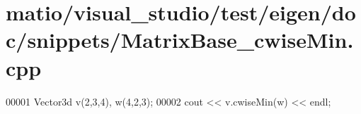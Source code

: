 \hypertarget{matio_2visual__studio_2test_2eigen_2doc_2snippets_2_matrix_base__cwise_min_8cpp_source}{}\section{matio/visual\+\_\+studio/test/eigen/doc/snippets/\+Matrix\+Base\+\_\+cwise\+Min.cpp}
\label{matio_2visual__studio_2test_2eigen_2doc_2snippets_2_matrix_base__cwise_min_8cpp_source}

\begin{DoxyCode}
00001 Vector3d v(2,3,4), w(4,2,3);
00002 cout << v.cwiseMin(w) << endl;
\end{DoxyCode}
